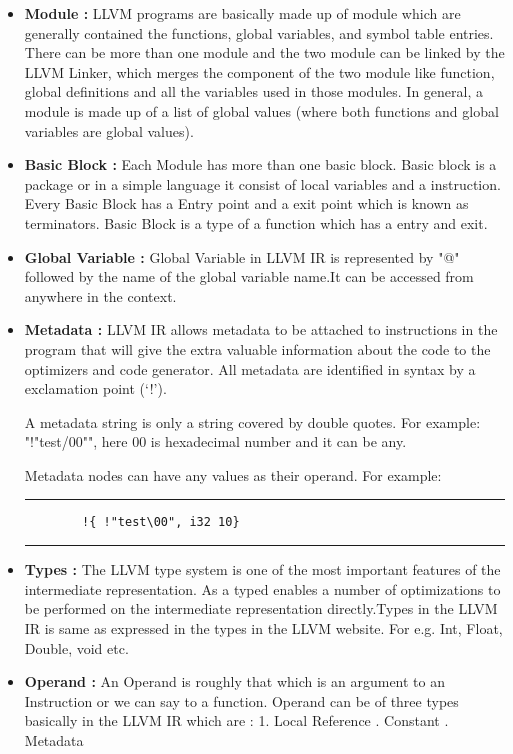 \documentclass[openany]{book}
\begin{document}
\begin{itemize}
	\item \textbf{Module : } LLVM programs are basically made up of module which are generally contained the functions, global variables, and symbol table entries. There can be more than one module and the two module can be linked by the LLVM Linker, which merges the component of the two module like function, global definitions and all the variables used in those modules. In general, a module is made up of a list of global values (where both functions and global variables are global values).
	\item \textbf{Basic Block : } Each Module has more than one basic block. Basic block is a package or in a simple language it consist of local variables and a instruction. Every Basic Block has a Entry point and a exit point which is known as terminators. Basic Block is a type of a function which has a entry and exit.
	\item \textbf{Global Variable : } Global Variable in LLVM IR is represented by "@" followed by the name of the global variable name.It can be accessed from anywhere in the context. 
	\item \textbf{Metadata : }LLVM IR allows metadata to be attached to instructions in the program that will give the extra valuable information about the code to the optimizers and code generator. All metadata are identified in syntax by a exclamation point (`!').
	
	A metadata string is only a string covered by double quotes.  For example: "!"test/00"", here 00 is hexadecimal number and it can be any.
	
	Metadata nodes can have any values as their operand. For example:\newline
	
	\noindent\rule{12cm}{0.4pt}
	
	\begin{verbatim}
		!{ !"test\00", i32 10}
	\end{verbatim}
	
	\noindent\rule{12cm}{0.4pt} \newline
	
	\item \textbf{Types : } The LLVM type system is one of the most important features of the intermediate representation. As a typed enables a number of optimizations to be performed on the intermediate representation directly.Types in the LLVM IR is same as expressed in the types in the LLVM website. For e.g. Int, Float, Double, void etc.
	\item \textbf{Operand : } An Operand is roughly that which is an argument to an Instruction or we can say to a function. Operand can be of three types basically in the LLVM IR which are :
	1. Local Reference . Constant . Metadata \newline
\end{itemize}
	
\end{document}
